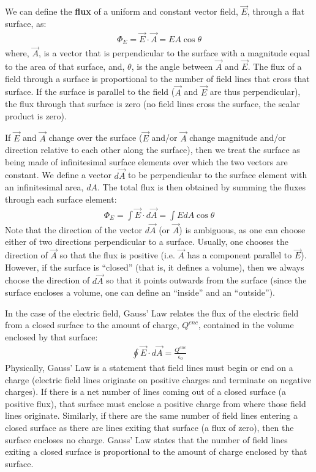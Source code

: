 \begin{chapterSummary}
We can define the \textbf{flux} of a uniform and constant vector field, $\vec E$, through a flat surface, as:
\begin{align*}
\Phi_E = \vec E \cdot \vec A = EA\cos\theta
\end{align*}
where, $\vec A$, is a vector that is perpendicular to the surface with a magnitude equal to the area of that surface, and, $\theta$, is the angle between $\vec A$ and $\vec E$. The flux of a field through a surface is proportional to the number of field lines that cross that surface. If the surface is parallel to the field ($\vec A$ and $\vec E$ are thus perpendicular), the flux through that surface is zero (no field lines cross the surface, the scalar product is zero).

If $\vec E$ and $\vec A$ change over the surface ($\vec E$ and/or $\vec A$ change magnitude and/or direction relative to each other along the surface), then we treat the surface as being made of infinitesimal surface elements over which the two vectors are constant. We define a vector $d\vec A$ to be perpendicular to the surface element with an infinitesimal area, $dA$. The total flux is then obtained by summing the fluxes through each surface element:
\begin{align*}
\Phi_E=\int \vec E \cdot d\vec A=\int EdA\cos\theta
\end{align*}
Note that the direction of the vector $d\vec A$ (or $\vec A$) is ambiguous, as one can choose either of two directions perpendicular to a surface. Usually, one chooses the direction of $\vec A$ so that the flux is positive (i.e. $\vec A$ has a component parallel to $\vec E$). However, if the surface is ``closed'' (that is, it defines a volume), then we always choose the direction of $d\vec A$ so that it points outwards from the surface (since the surface encloses a volume, one can define an ``inside'' and an ``outside''). 

In the case of the electric field, Gauss' Law relates the flux of the electric field from a closed surface to the amount of charge, $Q^{enc}$, contained in the volume enclosed by that surface:
\begin{align*}
\oint \vec E \cdot d\vec A = \frac{Q^{enc}}{\epsilon_0}
\end{align*}
Physically, Gauss' Law is a statement that field lines must begin or end on a charge (electric field lines originate on positive charges and terminate on negative charges). If there is a net number of lines coming out of a closed surface (a positive flux), that surface must enclose a positive charge from where those field lines originate. Similarly, if there are the same number of field lines entering a closed surface as there are lines exiting that surface (a flux of zero), then the surface encloses no charge. Gauss' Law states that the number of field lines exiting a closed surface is proportional to the amount of charge enclosed by that surface.


\end{chapterSummary}
